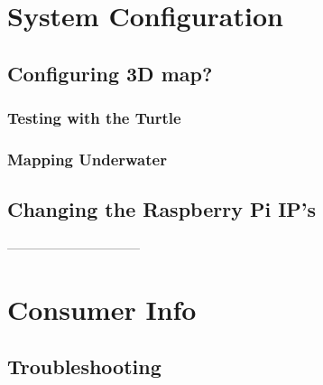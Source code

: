 \documentclass[
10pt, %
a4paper, %
oneside, %
headinclude,footinclude, %
BCOR5mm, %
]{scrartcl}
\begin{document}


\section{System Configuration}

\lipsum[10] %


\subsection{Configuring 3D map?}

\lipsum[11] %

\subsubsection{Testing with the Turtle}

\lipsum[12] %

\lipsum[12] %

\subsubsection{Mapping Underwater}

\lipsum[13] %



\subsection{Changing the Raspberry Pi IP's}

\lipsum[15-18] %


--------------------------------

\section{Consumer Info}

\subsection{Troubleshooting}
\lipsum[5] %
\end{document}
